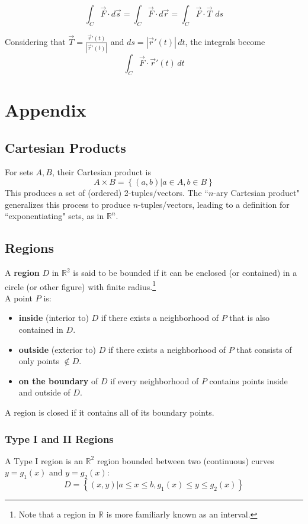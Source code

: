 \documentclass{article}
\newcommand{\vect}[1]{\ensuremath{\overrightarrow{#1}}}
\begin{document}
$$\int_C\vect{F}\cdot d\vect{s}=\int_C\vect{F}\cdot d\vect{r}=\int_C\vect{F}\cdot\vect{T}\,\,ds$$

Considering that $\vect{T}=\frac{\vect{r}'(t)}{\left|\vect{r}'(t)\right|}$ and $ds = \left|\vect{r}'(t)\right|\,dt$, the integrals become
$$\int_C\vect{F}\cdot\vect{r}'(t)\,dt$$

\section{Appendix}
\subsection{Cartesian Products} \label{set-multiplication}
For sets $A, B$, their Cartesian product is $$A \times B = \left\{ (a,b) | a \in A, b \in B\right\}$$
This produces a set of (ordered) 2-tuples/vectors.
The ``$n$-ary Cartesian product" generalizes this process to produce $n$-tuples/vectors, leading to a definition for ``exponentiating" sets, as in $\mathbb{R}^n$.

\subsection{Regions} \label{regions}
A \textbf{region} $D$ in $\mathbb{R}^2$ is said to be bounded if it can be enclosed (or contained) in a circle (or other figure) with finite radius.\footnote{Note that a region in $\mathbb{R}$ is more familiarly known as an interval.}\\
A point $P$ is:
\begin{itemize}
    \item \textbf{inside} (interior to) $D$ if there exists a neighborhood of $P$ that is also contained in $D$.
    \item \textbf{outside} (exterior to) $D$ if there exists a neighborhood of $P$ that consists of only points $\notin D$.
    \item \textbf{on the boundary} of $D$ if every neighborhood of $P$ contains points inside and outside of $D$.
\end{itemize}
A region is closed if it contains all of its boundary points.

\subsubsection{Type I and II Regions}
A Type I region is an $\mathbb{R}^2$ region bounded between two (continuous) curves $y=g_1(x)$ and $y=g_2(x)$:
$$D=\left\{(x,y)|a\le x\le b, g_1(x)\le y\le g_2(x)\right\}$$
\end{document}
